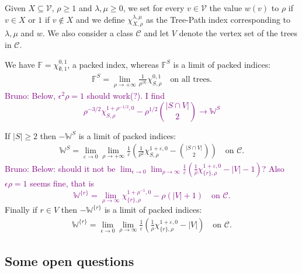 \documentclass[11 pt]{modarticle}
\newcommand{\vset}{\mathcal{V}}
\newcommand{\wmap}{w}
\newcommand{\size}[1]{|#1|}
\newcommand{\tclass}{\mathcal{C}}
\newcommand{\bldcomment}[1]{\textcolor{purple}{{\footnotesize Bruno:} #1}}
\begin{document}
Given $X \subseteq \vset$, $\rho \geq 1$ and $\lambda, \mu \geq 0$, we set for every $v \in \vset$ the value $\wmap(v)$ to $\rho$ if $v \in X$ or $1$ if $v \notin X$ and we define $\chi^{\lambda, \mu}_{X, \rho}$ as the Tree-Path index corresponding to $\lambda, \mu$ and $w$. We also consider a class $\tclass$ and let $V$ denote the vertex set of the trees in $\tclass$.


We have $\mathbb{F} = \chi^{0,1}_{\emptyset, 1}$, a packed index, whereas $\mathbb{F}^S$ is a limit of packed indices:
\begin{eqnarray*}
	\mathbb{F}^S = \lim_{\rho\to +\infty} \frac{1}{\rho^{\size{S}}} \chi^{0,1}_{S,\rho} \quad \text{on all trees.}
\end{eqnarray*}
\bldcomment{Below, $\epsilon^2 \rho = 1$ should work(?). I find
\[ \rho^{-3/2}\chi^{1 + \rho^{-1/2},0}_{S,\rho} - \rho^{1/2} \binom{\size{S \cap V}}{2} \to \mathbb{W}^S\]}

If $\size{S} \geq 2$ then $-\mathbb{W}^S$ is a limit of packed indices:
\begin{eqnarray*}
	\mathbb{W}^S = \lim_{\varepsilon \to 0} \lim_{\rho\to +\infty} \frac{1}{\varepsilon}\left(\frac{1}{\rho^2} \chi^{1+\varepsilon,0}_{S,\rho} - {\binom{\size{S \cap V}}{2}} \right) \quad \text{on $\tclass$.}
\end{eqnarray*}
\bldcomment{Below: should it not be $\lim_{\epsilon \to 0} \lim_{\rho\to\infty}\frac{1}{\varepsilon}\left(\frac{1}{\rho}\chi^{1+\varepsilon,0}_{\{r\},\rho}-\size{V} - 1\right)$? Also $\epsilon \rho = 1$ seems fine, that is
\[
	\mathbb{W}^{\{r\}} = \lim_{\rho\to\infty}\chi^{1+\rho^{-1},0}_{\{r\},\rho}- \rho \left(\size{V} + 1\right) \quad \text{on $\tclass$}.
\]}
Finally if $r \in V$ then $-\mathbb{W}^{\{r\}}$ is a limit of packed indices:
\begin{eqnarray*}
	\mathbb{W}^{\{r\}} = \lim_{\epsilon \to 0} \lim_{\rho\to\infty}\frac{1}{\varepsilon}\left(\frac{1}{\rho}\chi^{1+\varepsilon,0}_{\{r\},\rho}-\size{V}\right) \quad \text{on $\tclass$}.
\end{eqnarray*}
\subsection{Some open questions}
\end{document}
